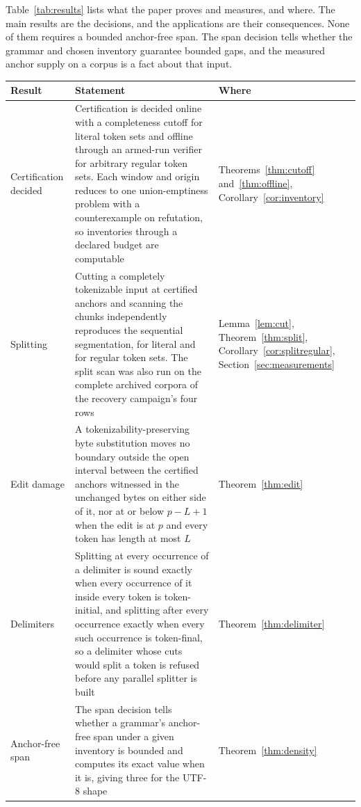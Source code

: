 \documentclass[11pt,a4paper]{article}
\theoremstyle{definition}
\theoremstyle{plain}
\begin{document}
Table~\ref{tab:results} lists what the paper proves and measures, and where. The main results are the decisions, and the
applications are their consequences. None of them requires a bounded anchor-free span. The span decision tells whether
the grammar and chosen inventory guarantee bounded gaps, and the measured anchor supply on a corpus is a fact about that
input.

\begin{table}[!htbp]
\centering
\small
\begin{tabular}{L{2.9cm}L{8.4cm}L{3.3cm}}
\toprule
Result & Statement & Where \\
\midrule
Certification decided & Certification is decided online with a completeness cutoff for literal token sets and offline
through an armed-run verifier for arbitrary regular token sets. Each window and origin reduces to one union-emptiness
problem with a counterexample on refutation, so inventories through a declared budget are computable &
Theorems~\ref{thm:cutoff} and~\ref{thm:offline}, Corollary~\ref{cor:inventory} \\
\addlinespace
Splitting & Cutting a completely tokenizable input at certified anchors and scanning the chunks independently reproduces
the sequential segmentation, for literal and for regular token sets. The split scan was also run on the complete
archived corpora of the recovery campaign's four rows & Lemma~\ref{lem:cut}, Theorem~\ref{thm:split},
Corollary~\ref{cor:splitregular},
Section~\ref{sec:measurements} \\
\addlinespace
Edit damage & A tokenizability-preserving byte substitution moves no boundary outside the open interval between the
certified anchors witnessed in the unchanged bytes on either side of it, nor at or below $p - L + 1$ when the edit is at
$p$ and every token has length at most $L$ & Theorem~\ref{thm:edit} \\
\addlinespace
Delimiters & Splitting at every occurrence of a delimiter is sound exactly when every occurrence of it inside every
token is token-initial, and splitting after every occurrence exactly when every such occurrence is token-final, so a
delimiter whose cuts would split a token is refused before any parallel splitter is built &
Theorem~\ref{thm:delimiter} \\
\addlinespace
Anchor-free span & The span decision tells whether a grammar's anchor-free span under a given inventory is bounded and
computes its exact value when it is, giving three for the UTF-8 shape & Theorem~\ref{thm:density} \\

\end{tabular}
\end{table}
\end{document}
